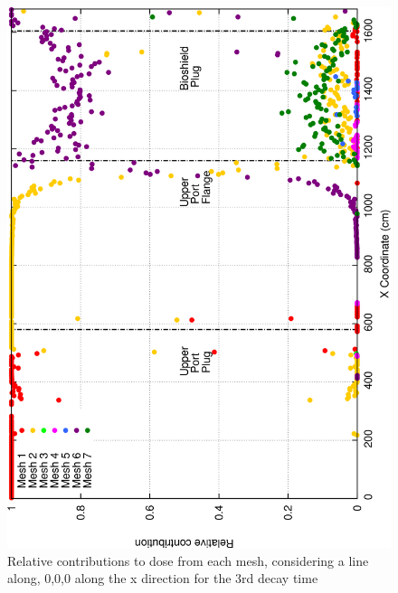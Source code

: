 \documentclass[12pt]{article}
\begin{document}
\begin{figure}[ht!]
\centering
\includegraphics[clip,scale=0.25]{../plots/crosstalk/nob4c/up/dc3_rel.png}
\caption{Relative contributions to dose from each mesh, considering a line along, 0,0,0 along the x direction for the 3rd decay time}
\label{fig:ct_up_dc3_rel}
\end{figure}
\newpage
\clearpage
\end{document}
